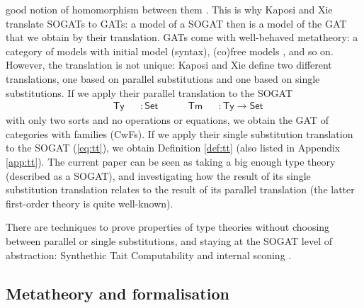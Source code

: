 \documentclass[submission,copyright,creativecommons]{eptcs}
\newcommand{\ra}{\rightarrow}
\newcommand{\Set}{\mathsf{Set}}
\newcommand{\Ty}{\mathsf{Ty}}
\newcommand{\Tm}{\mathsf{Tm}}
\begin{document}
good notion of homomorphism between them \cite[bottom of page 5]{DBLP:conf/fscd/KaposiX24}. This is why Kaposi and Xie
\cite{DBLP:conf/fscd/KaposiX24} translate SOGATs to GATs: a model of a
SOGAT then is a model of the GAT that we obtain by their
translation. GATs come with well-behaved metatheory: a category of
models with initial model (syntax), (co)free models
\cite{andras,DBLP:phd/hal/Moeneclaey22}, and so on. However, the
translation is not unique: Kaposi and Xie
\cite{DBLP:conf/fscd/KaposiX24} define two different translations, one
based on parallel substitutions and one based on single
substitutions. If we apply their parallel translation to the SOGAT
\vspace{-0.5em}
\begin{equation}\label{eq:tytm}
\begin{alignedat}{10}
  & \Ty && : \Set \hspace{3em} \Tm && : \Ty \ra\Set
\end{alignedat}
\end{equation}
with only two sorts and no operations or equations, we obtain the GAT
of categories with families (CwFs). If we apply their single substitution
translation to the SOGAT (\ref{eq:tt}), we obtain Definition
\ref{def:tt} (also listed in Appendix \ref{app:tt}). The current paper
can be seen as taking a big enough type theory (described as a SOGAT),
and investigating how the result of its single substitution
translation relates to the result of its parallel translation (the
latter first-order theory is quite well-known).

There are techniques to prove properties of type theories without
choosing between parallel or single substitutions, and staying at the
SOGAT level of abstraction: Synthethic Tait Computability
\cite{DBLP:phd/us/Sterling22} and internal sconing
\cite{DBLP:conf/fscd/BocquetKS23}.

\vspace{-0.5em}
\subsection{Metatheory and formalisation}\label{sec:metatheory}
\end{document}

